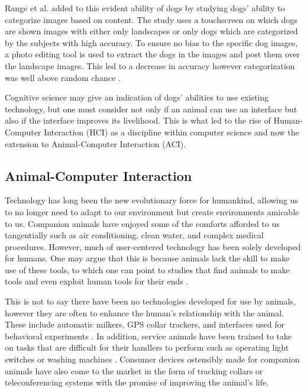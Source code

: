 \documentclass{sigchi}
\begin{document}
        Range et al. added to this evident ability of dogs by studying dogs’ ability to categorize images based on content. The study uses a touchscreen on which dogs are shown images with either only landscapes or only dogs which are categorized by the subjects with high accuracy. To ensure no bias to the specific dog images, a photo editing tool is used to extract the dogs in the images and post them over the landscape images. This led to a decrease in accuracy however categorization was well above random chance \cite{Range2008}.
        
        Cognitive science may give an indication of dogs’ abilities to use existing technology, but one must consider not only if an animal can use an interface but also if the interface improves its livelihood. This is what led to the rise of Human-Computer Interaction (HCI) as a discipline within computer science and now the extension to Animal-Computer Interaction (ACI).

    \subsection{Animal-Computer Interaction}
        Technology has long been the new evolutionary force for humankind, allowing us to no longer need to adapt to our environment but create environments amicable to us. Companion animals have enjoyed some of the comforts afforded to us tangentially such as air conditioning, clean water, and complex medical procedures. However, much of user-centered technology has been solely developed for humans. One may argue that this is because animals lack the skill to make use of these tools, to which one can point to studies that find animals to make tools and even exploit human tools for their ends \cite{Hunt2004}.
        
        This is not to say there have been no technologies developed for use by animals, however they are often to enhance the human’s relationship with the animal. These include automatic milkers, GPS collar trackers, and interfaces used for behavioral experiments \cite{Epstein2000,Garton2001}. In addition, service animals have been trained to take on tasks that are difficult for their handlers to perform such as operating light switches or washing machines \cite{Mancini2017a}. Consumer devices ostensibly made for companion animals have also come to the market in the form of tracking collars or teleconferencing systems with the promise of improving the animal’s life.
        
\end{document}
